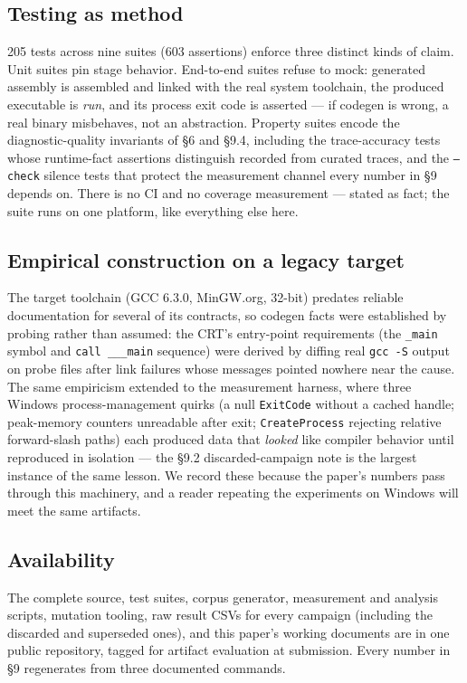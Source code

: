 \subsection{Testing as method}

205 tests across nine suites (603 assertions) enforce three
distinct kinds of claim. Unit suites pin stage behavior. End-to-end
suites refuse to mock: generated assembly is assembled and linked
with the real system toolchain, the produced executable is \emph{run},
and its process exit code is asserted --- if codegen is wrong, a real
binary misbehaves, not an abstraction. Property suites encode the
diagnostic-quality invariants of \S6 and \S9.4, including the
trace-accuracy tests whose runtime-fact assertions distinguish
recorded from curated traces, and the \texttt{--check} silence tests that
protect the measurement channel every number in \S9 depends on.
There is no CI and no coverage measurement --- stated as fact; the
suite runs on one platform, like everything else here.

\subsection{Empirical construction on a legacy target}

The target toolchain (GCC 6.3.0, MinGW.org, 32-bit) predates
reliable documentation for several of its contracts, so codegen
facts were established by probing rather than assumed: the CRT's
entry-point requirements (the \texttt{\_main} symbol and \texttt{call \_\_\_main}
sequence) were derived by diffing real \texttt{gcc -S} output on probe
files after link failures whose messages pointed nowhere near the
cause. The same empiricism extended to the measurement harness,
where three Windows process-management quirks (a null \texttt{ExitCode}
without a cached handle; peak-memory counters unreadable after
exit; \texttt{CreateProcess} rejecting relative forward-slash paths)
each produced data that \emph{looked} like compiler behavior until
reproduced in isolation --- the \S9.2 discarded-campaign note is the
largest instance of the same lesson. We record these because the
paper's numbers pass through this machinery, and a reader repeating
the experiments on Windows will meet the same artifacts.

\subsection{Availability}

The complete source, test suites, corpus generator, measurement and
analysis scripts, mutation tooling, raw result CSVs for every
campaign (including the discarded and superseded ones), and this
paper's working documents are in one public repository, tagged for
artifact evaluation at submission. Every number in \S9 regenerates
from three documented commands.



